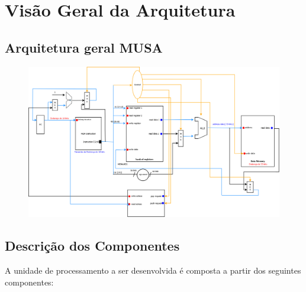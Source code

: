 \documentclass{report}
\begin{document}
\chapter{Visão Geral da Arquitetura}
  \section{Arquitetura geral MUSA}
  \begin{figure}[H]
	\centering
	\includegraphics[width=\linewidth]{./pictures/DataPaths/Arquitetura/DataPathFinal.png}
  \end{figure}  

  \section{Descrição dos Componentes}
  A unidade de processamento a ser desenvolvida é composta a partir dos seguintes componentes:
  
\end{document}
